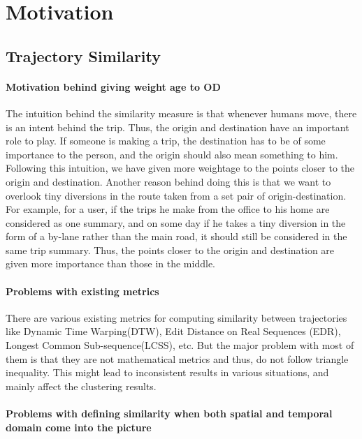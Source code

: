 \section{Motivation}

\subsection{Trajectory Similarity}

\paragraph{Motivation  behind giving weight age to OD }

\par  The intuition behind the similarity measure is that whenever humans move, there is an intent behind the trip. Thus, the origin and destination have an important role to play. If someone is making a trip, the destination has to be of some importance to the person, and the origin should also mean something to him. Following this intuition, we have given more weightage to the points closer to the origin and destination. Another reason behind doing this is that we want to overlook tiny diversions in the route taken from a set pair of origin-destination. For example, for a user, if the trips he make from the office to his home are considered as one summary, and on some day if he takes a tiny diversion in the form of a by-lane rather than the main road, it should still be considered  in the same trip summary. Thus, the points closer to the origin and destination are given more importance than those in the middle. 

\paragraph{ Problems with existing metrics}

\par There are various existing metrics for computing similarity between trajectories like  Dynamic Time Warping(DTW), Edit Distance on Real Sequences (EDR), Longest Common Sub-sequence(LCSS), etc.  But the major problem with most of them is that they are not mathematical metrics and thus, do not follow triangle inequality. This might lead to inconsistent results in various situations, and mainly affect the clustering results. 
\paragraph{Problems with defining similarity when both spatial and temporal domain come into the picture}


